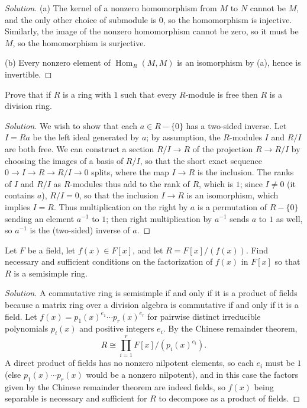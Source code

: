 \documentclass[10pt]{article}
\renewcommand{\hom}{\operatorname{Hom}}
\providecommand{\inv}{^{-1}}
\newenvironment{soln}{\begin{proof}[Solution]}{\end{proof}}
\begin{document}
\begin{soln}
    (a) The kernel of a nonzero homomorphism from $M$ to $N$
    cannot be $M$, and the only other choice of submodule
    is $0$, so the homomorphism is injective.
    Similarly, the image of the nonzero homomorphism
    cannot be zero, so it must be $M$,
    so the homomorphism is surjective.

    (b) Every nonzero element of $\hom_R(M,M)$
    is an isomorphism by (a), hence is invertible.
\end{soln}

\begin{problem}
    [\S18.2\#11]
    Prove that if $R$ is a ring with $1$
    such that every $R$-module is free then $R$ is a division ring.
\end{problem}

\begin{soln}
    We wish to show that each $a\in R-\{0\}$ has a two-sided inverse.
    Let $I = Ra$ be the left ideal generated by $a$;
    by assumption, the $R$-modules $I$ and $R/I$ are both free.
    We can construct a section $R/I\to R$ of the projection $R\to R/I$
    by choosing the images of a basis of $R/I$,
    so that the short exact sequence $0\to I\to R\to R/I\to 0$ splits,
    where the map $I\to R$ is the inclusion.
    The ranks of $I$ and $R/I$ as $R$-modules thus add to
    the rank of $R$, which is $1$; since $I\ne 0$ (it contains $a$),
    $R/I = 0$, so that the inclusion $I\to R$ is an isomorphism,
    which implies $I = R$. Thus multiplication on the right by $a$
    is a permutation of $R - \{0\}$ sending an element $a\inv$ to $1$;
    then right multiplication by $a\inv$ sends $a$ to $1$ as well,
    so $a\inv$ is the (two-sided) inverse of $a$.
\end{soln}

\pagebreak

\begin{problem}
    [\S18.2\#12]
    Let $F$ be a field, let $f(x)\in F[x]$, and let $R = F[x]/(f(x))$.
    Find necessary and sufficient conditions on the factorization
    of $f(x)$ in $F[x]$ so that $R$ is a semisimple ring.
\end{problem}

\begin{soln}
    A commutative ring is semisimple
    if and only if it is a product of fields
    because a matrix ring over a division algebra
    is commutative if and only if it is a field.
    Let $f(x) = p_1(x)^{e_1}\cdots p_r(x)^{e_r}$
    for pairwise distinct irreducible polynomials
    $p_i(x)$ and positive integers $e_i$.
    By the Chinese remainder theorem,
    \begin{equation*}
	R\cong\prod_{i=1}^r F[x]/(p_i(x)^{e_i}).
    \end{equation*}
    A direct product of fields has no nonzero nilpotent elements,
    so each $e_i$ must be $1$ (else $p_1(x)\cdots p_r(x)$
    would be a nonzero nilpotent), and in this case
    the factors given by the Chinese remainder theorem
    are indeed fields, so $f(x)$ being separable
    is necessary and sufficient for $R$ to decompose as
    a product of fields.
\end{soln}
\end{document}
